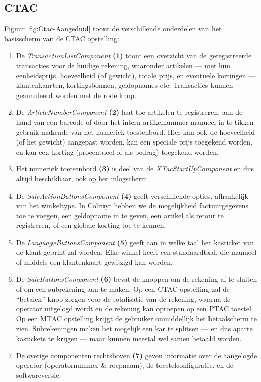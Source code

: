 \subsection{CTAC}

Figuur \ref{fig:Ctac-Aangeduid} toont de verschillende onderdelen van het basisscherm van de CTAC opstelling:

\begin{enumerate}
    \item De \emph{TransactionListComponent} \textbf{(1)} toont een overzicht van de geregistreerde transacties voor de huidige rekening, waaronder artikelen — met hun eenheidsprijs, hoeveelheid (of gewicht), totale prijs, en eventuele kortingen — klantenkaarten, kortingsbonnen, geldopnames etc. Transacties kunnen geannuleerd worden met de rode knop.
    \item De \emph{ArticleNumberComponent} \textbf{(2)} laat toe artikelen te registreren, aan de hand van een barcode of door het intern artikelnummer manueel in te tikken gebruik makende van het numeriek toestenbord. Hier kan ook de hoeveelheid (of het gewicht) aangepast worden, kan een speciale prijs toegekend worden, en kan een korting (procentueel of als bedrag) toegekend worden.
    \item Het numeriek toetsenbord \textbf{(3)} is deel van de \emph{XTacStartUpComponent} en dus altijd beschikbaar, ook op het inlogscherm.
    \item De \emph{SaleActionButtonsComponent} \textbf{(4)} geeft verschillende opties, afhankelijk van het winkeltype. In Colruyt hebben we de mogelijkheid factuurgegevens toe te voegen, een geldopname in te geven, een artikel als retour te registreren, of een globale korting toe te kennen.
    \item De \emph{LanguageButtonsComponent} \textbf{(5)} geeft aan in welke taal het kasticket van de klant geprint zal worden. Elke winkel heeft een standaardtaal, die manueel of middels een klantenkaart gewijzigd kan worden.
    \item De \emph{SaleButtonsComponent} \textbf{(6)} bevat de knoppen om de rekening af te sluiten of om een subrekening aan te maken. Op een CTAC opstelling zal de ``betalen'' knop zorgen voor de totalisatie van de rekening, waarna de operator uitgelogd wordt en de rekening kan oproepen op een PTAC toestel. Op een MTAC opstelling krijgt de gebruiker onmiddellijk het betaalscherm te zien. Subrekeningen maken het mogelijk een kar te splitsen — en dus aparte kastickets te krijgen — maar kunnen meestal wel samen betaald worden.
    \item De overige componenten rechtsboven \textbf{(7)} geven informatie over de aangelogde operator (operatornummer \& roepnaam), de toestelconfiguratie, en de softwareversie.
\end{enumerate}

